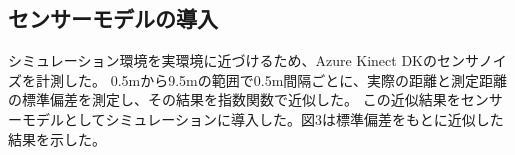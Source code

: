 \subsection{センサーモデルの導入}
シミュレーション環境を実環境に近づけるため、Azure Kinect DKのセンサノイズを計測した。
0.5mから9.5mの範囲で0.5m間隔ごとに、実際の距離と測定距離の標準偏差を測定し、その結果を指数関数で近似した。
この近似結果をセンサーモデルとしてシミュレーションに導入した。図3は標準偏差をもとに近似した結果を示した。




